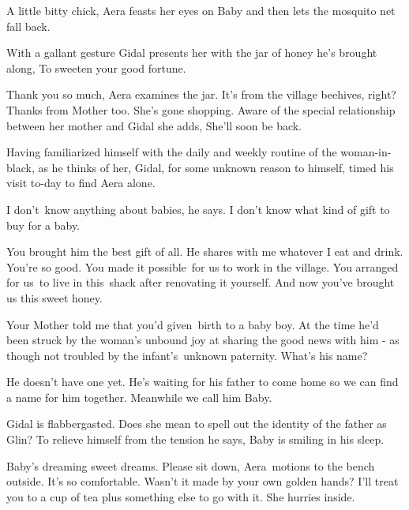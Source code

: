 \documentclass[letterpaper]{article}
\begin{document}
{\textquotedbl}A little bitty chick,{\textquotedbl} Aera feasts her eyes on Baby and then lets the mosquito net fall
back.\ 

With a gallant gesture Gidal presents her with the jar of honey he's brought along, {\textquotedbl}To sweeten your good
fortune.{\textquotedbl} 

{\textquotedbl}Thank you so much,{\textquotedbl} Aera examines the jar. {\textquotedbl}It's from the village beehives,
right? Thanks from Mother too. She's gone shopping.{\textquotedbl} Aware of the special relationship between her mother
and Gidal she adds, {\textquotedbl}She'll soon be back.{\textquotedbl} 

Having familiarized himself with the daily and weekly routine of the woman-in-black, as he thinks of her, Gidal, for
some unknown reason to himself, timed his visit to-day to find Aera alone.

 {\textquotedbl}I don't~know anything about babies,{\textquotedbl} he says. {\textquotedbl}I don't know what kind of
gift to buy for a baby.{\textquotedbl}\ 

{\textquotedbl}You brought him the best gift of all. He shares with me whatever I eat and drink. You're so good. You
made it possible\textcolor[rgb]{0.0,0.4392157,0.7529412}{\ }for us to work in the village. You arranged for us~to live
in this~shack after renovating it yourself. And now you've brought us this sweet honey.{\textquotedbl} 

{\textquotedbl}Your Mother told me that you'd given\textcolor[rgb]{0.0,0.4392157,0.7529412}{\ }birth to a baby
boy.{\textquotedbl} At the time he'd been struck by the woman's unbound joy at sharing the good news with him {}- as
though not troubled by the infant's\textcolor{red}{\ }unknown paternity. {\textquotedbl}What's his
name?{\textquotedbl}\ 

{\textquotedbl}He doesn't have one yet. He's waiting for his father to come home so we can find a name for him together.
Meanwhile we call him Baby.{\textquotedbl} 

Gidal is flabbergasted. Does she mean to spell out the identity of the father as Glin? To relieve himself from the
tension he says, {\textquotedbl}Baby is smiling in his sleep.{\textquotedbl} ~

{\textquotedbl}Baby{}'s dreaming sweet dreams. Please sit down,{\textquotedbl} Aera\ motions to the bench
outside\textcolor[rgb]{0.0,0.4392157,0.7529412}{.} {\textquotedbl}It's so comfortable. Wasn't it made by your own
golden hands? I'll treat you to a cup of tea plus something else to go with it.{\textquotedbl} She hurries inside. 
\end{document}
